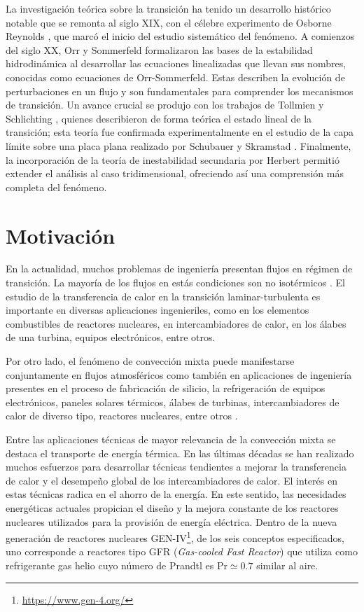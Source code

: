 La investigación teórica sobre la transición ha tenido un desarrollo histórico notable que se remonta al siglo XIX, con el célebre experimento de Osborne Reynolds \cite{reynolds1883}, que marcó el inicio del estudio sistemático del fenómeno. A comienzos del siglo XX, Orr \cite{orr1907} y Sommerfeld \cite{sommerfeld1908} formalizaron las bases de la estabilidad hidrodinámica al desarrollar las ecuaciones linealizadas que llevan sus nombres, conocidas como ecuaciones de Orr-Sommerfeld. Estas describen la evolución de perturbaciones en un flujo y son fundamentales para comprender los mecanismos de transición. Un avance crucial se produjo con los trabajos de Tollmien \cite{tollmien1930} y Schlichting \cite{schlichting1933}, quienes describieron de forma teórica el estado lineal de la transición; esta teoría fue confirmada experimentalmente en el estudio de la capa límite sobre una placa plana realizado por Schubauer y Skramstad \cite{schubauer1947laminar}. Finalmente, la incorporación de la teoría de inestabilidad secundaria por Herbert \cite{herbert1983secondary} permitió extender el análisis al caso tridimensional, ofreciendo así una comprensión más completa del fenómeno.


\section{Motivación}

En la actualidad, muchos problemas de ingeniería presentan flujos en régimen de transición. La mayoría de los flujos en estás condiciones son no isotérmicos \cite{chen2003direct}. El estudio de la transferencia de calor en la transición laminar-turbulenta es importante en diversas aplicaciones ingenieriles, como en los elementos combustibles de reactores nucleares, en intercambiadores de calor, en los álabes de una turbina, equipos electrónicos, entre otros.

Por otro lado, el fenómeno de convección mixta puede manifestarse conjuntamente en flujos atmosféricos \cite{pirozzoli2017mixed} como también en aplicaciones de ingeniería presentes en el proceso de fabricación de silicio, la refrigeración de equipos electrónicos, paneles solares térmicos, álabes de turbinas, intercambiadores de calor de diverso tipo, reactores nucleares, entre otros \cite{kasagi1997direct}. 

Entre las aplicaciones técnicas de mayor relevancia de la convección mixta se destaca el transporte de energía térmica. En las últimas décadas se han realizado muchos esfuerzos para desarrollar técnicas tendientes a mejorar la transferencia de calor y el desempeño global de los intercambiadores de calor. El interés en estas técnicas radica en el ahorro de la energía. En este sentido, las necesidades energéticas actuales propician el diseño y la mejora constante de los reactores nucleares utilizados para la provisión de energía eléctrica. Dentro de la nueva generación de reactores nucleares GEN-IV\footnote{\url{https://www.gen-4.org/}}, de los seis conceptos especificados, uno corresponde a reactores tipo GFR (\textit{Gas-cooled Fast Reactor}) que utiliza como refrigerante gas helio cuyo número de Prandtl es Pr$\simeq0.7$ similar al aire.



